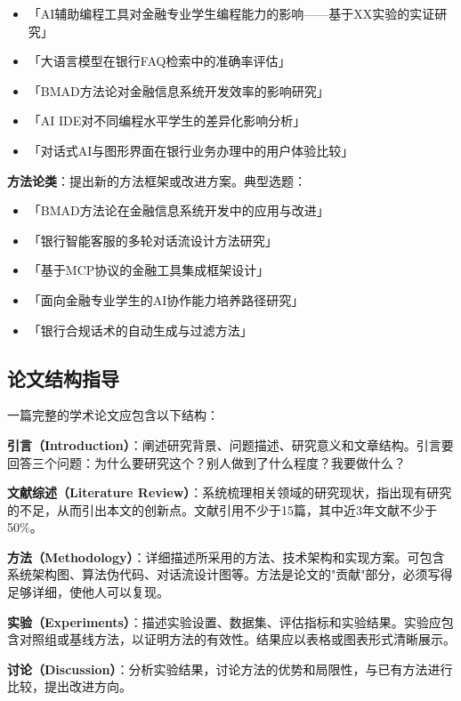 \begin{itemize}[leftmargin=2em]
  \item 「AI辅助编程工具对金融专业学生编程能力的影响——基于XX实验的实证研究」
  \item 「大语言模型在银行FAQ检索中的准确率评估」
  \item 「BMAD方法论对金融信息系统开发效率的影响研究」
  \item 「AI IDE对不同编程水平学生的差异化影响分析」
  \item 「对话式AI与图形界面在银行业务办理中的用户体验比较」
\end{itemize}

\textbf{方法论类}：提出新的方法框架或改进方案。典型选题：

\begin{itemize}[leftmargin=2em]
  \item 「BMAD方法论在金融信息系统开发中的应用与改进」
  \item 「银行智能客服的多轮对话流设计方法研究」
  \item 「基于MCP协议的金融工具集成框架设计」
  \item 「面向金融专业学生的AI协作能力培养路径研究」
  \item 「银行合规话术的自动生成与过滤方法」
\end{itemize}

\subsection{论文结构指导}

一篇完整的学术论文应包含以下结构：

\textbf{引言（Introduction）}：阐述研究背景、问题描述、研究意义和文章结构。引言要回答三个问题：为什么要研究这个？别人做到了什么程度？我要做什么？

\textbf{文献综述（Literature Review）}：系统梳理相关领域的研究现状，指出现有研究的不足，从而引出本文的创新点。文献引用不少于15篇，其中近3年文献不少于50\%。

\textbf{方法（Methodology）}：详细描述所采用的方法、技术架构和实现方案。可包含系统架构图、算法伪代码、对话流设计图等。方法是论文的"贡献"部分，必须写得足够详细，使他人可以复现。

\textbf{实验（Experiments）}：描述实验设置、数据集、评估指标和实验结果。实验应包含对照组或基线方法，以证明方法的有效性。结果应以表格或图表形式清晰展示。

\textbf{讨论（Discussion）}：分析实验结果，讨论方法的优势和局限性，与已有方法进行比较，提出改进方向。


